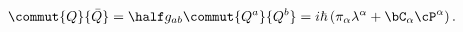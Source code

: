 \begin{equation}
\commut{Q}{\bar Q}=\half g_{ab}\commut{Q^a}{Q^b}=i\hbar\,
(\pi_\alpha \lambda^\alpha+ \bC_\alpha \cP^\alpha)\,.
\end{equation}


